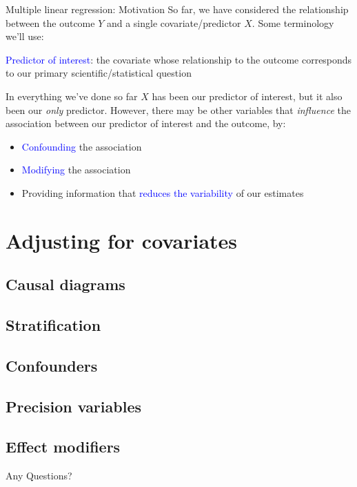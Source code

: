 \documentclass[10pt,t]{beamer}
\begin{document}
\begin{frame}{Multiple linear regression: Motivation}
So far, we have considered the relationship between the outcome $Y$ and a single covariate/predictor $X$. Some terminology we'll use:

\vspace{0.3cm}

\textcolor{blue}{Predictor of interest}: the covariate whose relationship to the outcome corresponds to our primary scientific/statistical question \pause

\vspace{0.3cm}

In everything we've done so far $X$ has been our predictor of interest, but it also been our \textit{only} predictor. However, there may be other variables that \textit{influence} the association between our predictor of interest and the outcome, by:

\vspace{0.3cm}

\begin{itemize}
	\item \textcolor{blue}{Confounding} the association
	\item \textcolor{blue}{Modifying} the association
	\item Providing information that \textcolor{blue}{reduces the variability} of our estimates
\end{itemize}


\end{frame}

\section{Adjusting for covariates}

\subsection{Causal diagrams}

\subsection{Stratification}

\subsection{Confounders}

\subsection{Precision variables}

\subsection{Effect modifiers}





\begin{frame}[c]
\centering \huge Any Questions?
\end{frame}
\end{document}
